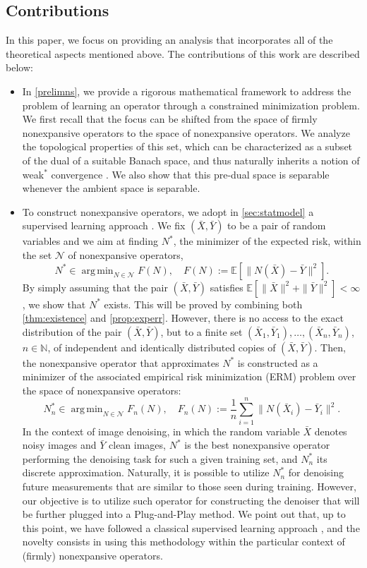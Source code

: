 \documentclass[onefignum,onetabnum]{siamonline250211}
\newcommand{\N}{\mathcal{N}}
\newcommand{\bX}{\bar{X}}
\newcommand{\bY}{\bar{Y}}
\DeclareMathOperator*{\argmin}{arg\,min}
\begin{document}
\subsection*{Contributions} In this paper, we focus on providing an analysis that incorporates all of the theoretical aspects mentioned above. The contributions of this work are described below:
\begin{itemize}
 \item In \cref{prelimns}, we provide a rigorous mathematical framework to address the problem of learning an operator through a constrained minimization problem. We first recall that the focus can be shifted from the space of firmly nonexpansive operators to the space of nonexpansive operators. We analyze the topological properties of this set, which can be characterized as a subset of the dual of a suitable Banach space, and thus naturally inherits a notion of weak$^*$ convergence  \cite{Guerrero2018, Weaver}. We also show that this pre-dual space is separable whenever the ambient space is separable.

 \item To construct nonexpansive operators, we adopt in \cref{sec:statmodel} a supervised learning approach \cite{cusma}. We fix $(\bar X, \bar Y)$ to be a pair of random variables and we aim at finding $N^*$, the minimizer of the expected risk, within the set $\mathcal{N}$ of nonexpansive operators,
 $$
 N^*\in\argmin_{N\in\mathcal{N}}F(N), \quad F(N):=\mathbb{E}[\|N(\bar X)-\bar Y\|^2].
 $$
By simply assuming that the pair $(\bar X, \bar Y)$ satisfies $\mathbb{E}[\|\bar X\|^2+\|\bar Y\|^2]<\infty$, we show that $N^*$ exists. This will be proved by combining both \cref{thm:existence} and \cref{prop:experr}. However, there is no access to the exact distribution of the pair $(\bar X, \bar Y)$, but to a finite set $(\bar X_1,\bar Y_1), \ldots, (\bX_n, \bY_n)$, $n\in\mathbb{N}$, of independent and identically distributed copies of $(\bar X, \bar Y)$. Then, the nonexpansive operator that approximates $N^*$ is constructed as a minimizer of the associated empirical risk minimization (ERM) problem over the space of nonexpansive operators:
\begin{equation}\label{eq:nonexERM}
N^*_n\in\argmin_{N\in \N}F_n(N), \quad F_n(N):=\frac{1}{n}\sum_{i=1}^n\|N(\bar X_i)-\bar Y_i\|^2.
\end{equation}
In the context of image denoising, in which the random variable $\bar X$ denotes noisy images and $\bar Y$ clean images, $N^*$ is the best nonexpansive operator performing the denoising task for such a given training set, and $N^*_n$ its discrete approximation. Naturally, it is possible to utilize $N^*_n$ for denoising future measurements that are similar to those seen during training. However, our objective is to utilize such operator for constructing the denoiser that will be further plugged into a Plug-and-Play method. We point out that, up to this point, we have followed a classical supervised learning approach \cite{cusma}, and the novelty consists in using this methodology within the particular context of (firmly) nonexpansive operators.


\end{itemize}
\end{document}
